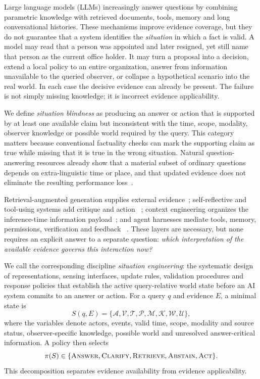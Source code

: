\label{sec:introduction}

Large language models (LLMs) increasingly answer questions by combining
parametric knowledge with retrieved documents, tools, memory and long
conversational histories. These mechanisms improve evidence coverage, but they
do not guarantee that a system identifies the \emph{situation} in which a fact
is valid. A model may read that a person was appointed and later resigned, yet
still name that person as the current office holder. It may turn a proposal
into a decision, extend a local policy to an entire organization, answer from
information unavailable to the queried observer, or collapse a hypothetical
scenario into the real world. In each case the decisive evidence can already be
present. The failure is not simply missing knowledge; it is incorrect evidence
applicability.

We define \emph{situation blindness} as producing an answer or action that is
supported by at least one available claim but inconsistent with the time, scope,
modality, observer knowledge or possible world required by the query. This
category matters because conventional factuality checks can mark the supporting
claim as true while missing that it is true in the wrong situation. Natural
question-answering resources already show that a material subset of ordinary
questions depends on extra-linguistic time or place, and that updated evidence
does not eliminate the resulting performance loss~\cite{zhang2021situatedqa,
vu2023freshqa,meem2024pat,chen2021timeqa,chen2025chronoqa}.

Retrieval-augmented generation supplies external evidence~\cite{lewis2020rag};
self-reflective and tool-using systems add critique and action
~\cite{asai2024selfrag,yao2023react,schick2023toolformer}; context engineering
organizes the inference-time information payload~\cite{mei2025context}; and
agent harnesses mediate tools, memory, permissions, verification and feedback
~\cite{zhong2026harness,lin2026ahe}. These layers are necessary, but none
requires an explicit answer to a separate question: \emph{which interpretation
of the available evidence governs this interaction now?}

We call the corresponding discipline \emph{situation engineering}: the
systematic design of representations, sensing interfaces, update rules,
validation procedures and response policies that establish the active
query-relative world state before an AI system commits to an answer or action.
For a query $q$ and evidence $E$, a minimal state is
\begin{equation}
S(q,E)=\{\mathcal{A},\mathcal{V},\mathcal{T},\mathcal{P},\mathcal{M},
\mathcal{K},\mathcal{W},\mathcal{U}\},
\end{equation}
where the variables denote actors, events, valid time, scope, modality and
source status, observer-specific knowledge, possible world and unresolved
answer-critical information. A policy then selects
\begin{equation}
\pi(S)\in\{\textsc{Answer},\textsc{Clarify},\textsc{Retrieve},
\textsc{Abstain},\textsc{Act}\}.
\end{equation}
This decomposition separates evidence availability from evidence applicability.

